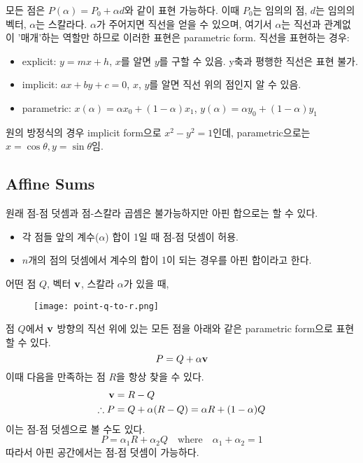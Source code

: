 모든 점은 $P(\alpha) = P_0 + \alpha d$와 같이 표현 가능하다. 이때 $P_0$는 임의의 점, $d$는 임의의 벡터, $\alpha$는 스칼라다. $\alpha$가 주어지면 직선을 얻을 수 있으며, 여기서 $\alpha$는 직선과 관계없이 '매개'하는 역할만 하므로 이러한 표현은 parametric form. 직선을 표현하는 경우:

\begin{itemize}
  \item explicit: $y = mx + h$, $x$를 알면 $y$를 구할 수 있음. y축과 평행한 직선은 표현 불가.
  \item implicit: $ax + by + c = 0$, $x$, $y$를 알면 직선 위의 점인지 알 수 있음.
  \item parametric: $x(\alpha) = \alpha x_0 + (1 - \alpha)x_1$, $y(\alpha) = \alpha y_0 + (1 - \alpha)y_1$
\end{itemize}

원의 방정식의 경우 implicit form으로 $x^2 - y^2 = 1$인데, parametric으로는 $x = \cos{\theta}, y = \sin{\theta}$임.

\subsection{Affine Sums}

원래 점-점 덧셈과 점-스칼라 곱셈은 불가능하지만 아핀 합으로는 할 수 있다.

\begin{itemize}
  \item 각 점들 앞의 계수($\alpha$) 합이 1일 때 점-점 덧셈이 허용.
  \item $n$개의 점의 덧셈에서 계수의 합이 1이 되는 경우를 아핀 합이라고 한다.
\end{itemize}

어떤 점 $Q$, 벡터 $\bold{v}$, 스칼라 $\alpha$가 있을 때,

\begin{figure}[h]
  \centering
  \texttt{[image: point-q-to-r.png]}
\end{figure}

점 $Q$에서 $\bold{v}$ 방향의 직선 위에 있는 모든 점을 아래와 같은 parametric form으로 표현할 수 있다.
$$P = Q + \alpha \bold{v}$$
이때 다음을 만족하는 점 $R$을 항상 찾을 수 있다.
$$
\begin{aligned}
  \bold{v} &= R - Q \\
  \therefore P &= Q + \alpha (R - Q) = \alpha R + (1 - \alpha) Q
\end{aligned}
$$
이는 점-점 덧셈으로 볼 수도 있다.
$$P = \alpha_1 R + \alpha_2 Q \quad \text{where} \quad \alpha_1 + \alpha_2 = 1$$
따라서 아핀 공간에서는 점-점 덧셈이 가능하다.

